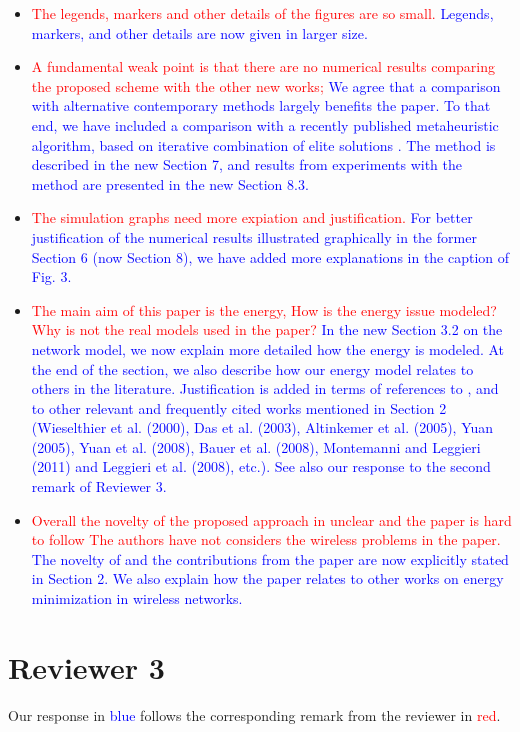 \documentclass[12pt]{article}
\begin{document}
\begin{itemize}
{Done.
}
\item \textcolor{red}{The legends, markers and other details of the figures are so small.} \textcolor{blue}{
Legends, markers, and other details are now given in larger size.
}
\item \textcolor{red}{A fundamental weak point is that there are no numerical results comparing the proposed scheme with the other new works;} \textcolor{blue}{
We agree that a comparison with alternative contemporary methods largely benefits the paper.
To that end, we have included a comparison with a recently published metaheuristic algorithm, based on iterative combination of elite solutions \cite{pajor18}.
The method is described in the new Section 7, and results from experiments with the method are presented in the new Section 8.3.
}
\item \textcolor{red}{The simulation graphs need more expiation and justification.} \textcolor{blue}{
For better justification of the numerical results illustrated graphically in the former Section 6 (now Section 8),
we have added more explanations in the caption of Fig. 3.
}
\item \textcolor{red}{ The main aim of this paper is the energy, How is the energy issue modeled? Why is not the real models used in the paper?} \textcolor{blue}{
In the new Section 3.2 on the network model, we now explain more detailed how the energy is modeled.
At the end of the section, we also describe how our energy model relates to others in the literature.
Justification is added in terms of references to \cite{halgamuge}, and to other relevant and frequently cited works mentioned in Section 2 (Wieselthier et al. (2000), Das et al. (2003), Altinkemer et al. (2005),
Yuan (2005), Yuan et al. (2008), Bauer et al. (2008), Montemanni and Leggieri (2011) and Leggieri et al. (2008), etc.).
See also our response to the second remark of Reviewer 3.
}
\item \textcolor{red}{Overall the novelty of the proposed approach in unclear and the paper is hard to follow
The authors have not considers the wireless problems in the paper.} \textcolor{blue}{
The novelty of and the contributions from the paper are now explicitly stated in Section 2.
We also explain how the paper relates to other works on energy minimization in wireless networks.
}
\end{itemize}

\section*{Reviewer 3}
Our response in \textcolor{blue}{blue} follows the corresponding remark from the reviewer in \textcolor{red}{red}.
\end{document}
